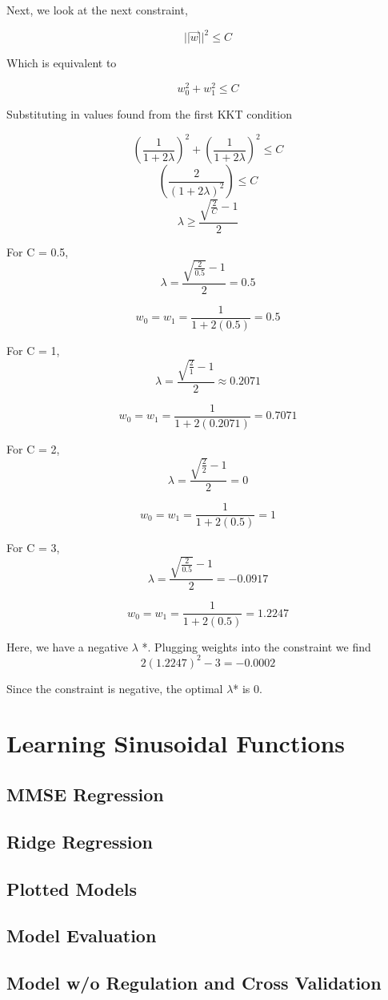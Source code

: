 \documentclass{article}
\begin{document}
Next, we look at the next constraint,

\[||\Vec{w}||^2 \leq C\] 

Which is equivalent to 

\[w_0^2 + w_1^2 \leq C\] 

Substituting in values found from the first KKT condition

\[(\frac{1}{1+2\lambda})^2 + (\frac{1}{1+2\lambda})^2  \leq C\]
\[(\frac{2}{(1+2\lambda)^2}) \leq C\]
\[\lambda \ge \frac{\sqrt{\frac{2}{C}} - 1}{2}\]

For C = 0.5, 
\[\lambda = \frac{\sqrt{\frac{2}{0.5}} - 1}{2} = 0.5\]

\[w_0 = w_1 = \frac{1}{1+2(0.5)} = 0.5 \]

For C = 1, 
\[\lambda = \frac{\sqrt{\frac{2}{1}} - 1}{2} \approx 0.2071 \]

\[w_0 = w_1 = \frac{1}{1+2(0.2071)} = 0.7071 \]

For C = 2, 
\[\lambda = \frac{\sqrt{\frac{2}{2}} - 1}{2} = 0\]

\[w_0 = w_1 = \frac{1}{1+2(0.5)} = 1 \]

For C = 3, 
\[\lambda = \frac{\sqrt{\frac{2}{0.5}} - 1}{2} = -0.0917\]

\[w_0 = w_1 = \frac{1}{1+2(0.5)} = 1.2247 \]

Here, we have a negative $\lambda$ *. Plugging weights into the constraint we find
\[2(1.2247)^2 - 3 = -0.0002 \] 

Since the constraint is negative, the optimal $\lambda$* is 0.

\section{Learning Sinusoidal Functions}
\subsection{MMSE Regression}
\subsection{Ridge Regression}
\subsection{Plotted Models}
\subsection{Model Evaluation}
\subsection{Model w/o Regulation and Cross Validation}
\end{document}
